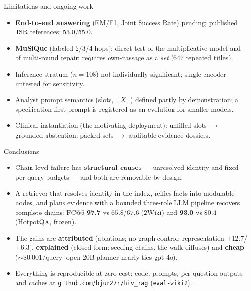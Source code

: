 \documentclass[aspectratio=169,10pt]{beamer}
\begin{document}
\begin{frame}{Limitations and ongoing work}
\begin{itemize}
\item \textbf{End-to-end answering} (EM/F1, Joint Success Rate) pending;
  published JSR references: $53.0$/$55.0$.
\item \textbf{MuSiQue} (labeled 2/3/4 hops): direct test of the
  multiplicative model and of multi-round repair; requires own-passage as a
  \emph{set} ($647$ repeated titles).
\item Inference stratum ($n{=}108$) not individually significant; single
  encoder untested for sensitivity.
\item Analyst prompt semantics (slots, $[X]$) defined partly by
  demonstration; a specification-first prompt is registered as an evolution
  for smaller models.
\item Clinical instantiation (the motivating deployment): unfilled slots
  $\to$ grounded abstention; packed sets $\to$ auditable evidence dossiers.
\end{itemize}
\end{frame}

\begin{frame}{Conclusions}
\begin{itemize}
\item Chain-level failure has \textbf{structural causes} --- unresolved
  identity and fixed per-query budgets --- and both are removable by design.
\item A retriever that resolves identity in the index, reifies facts into
  modulable nodes, and plans evidence with a bounded three-role LLM
  pipeline recovers complete chains: $\mathrm{FC@}5$
  \textbf{97.7} vs $65.8$/$67.6$ (2Wiki) and \textbf{93.0} vs $80.4$
  (HotpotQA, frozen).
\item The gains are \textbf{attributed} (ablations; no-graph control:
  representation $+12.7$/$+6.3$), \textbf{explained} (closed form:
  seeding chains, the walk diffuses) and \textbf{cheap}
  (${\sim}\$0.001$/query; open 20B planner nearly ties gpt-4o).
\item Everything is reproducible at zero cost: code, prompts, per-question
  outputs and caches at \texttt{github.com/bjur27r/hiv\_rag}
  (\texttt{eval-wiki2}).
\end{itemize}
\end{frame}
\end{document}
